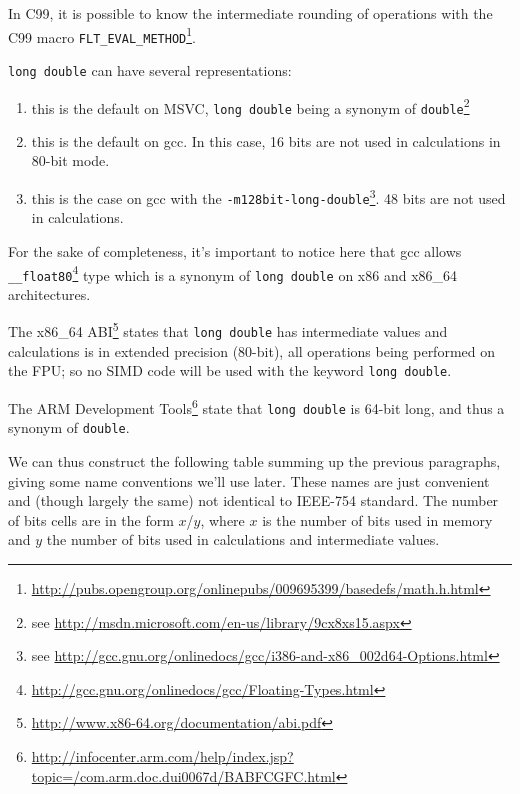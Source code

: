 In C99, it is possible to know the intermediate rounding of operations with the C99 macro \texttt{FLT\_EVAL\_METHOD}\footnote{\url{http://pubs.opengroup.org/onlinepubs/009695399/basedefs/math.h.html}}.


\texttt{long double} can have several representations:
\begin{enumerate}
\setlength{\itemsep}{0pt}
\setlength{\parskip}{0pt}
\item[\enumstyle{64-bit}] this is the default on MSVC, \texttt{long double} being a synonym of \texttt{double}\footnote{see \url{http://msdn.microsoft.com/en-us/library/9cx8xs15.aspx}}
\item[\enumstyle{96-bit}] this is the default on gcc. In this case, 16 bits are not used in calculations in 80-bit mode.
\item[\enumstyle{128-bit}] this is the case on gcc with the \texttt{-m128bit-long-double}\footnote{see \url{http://gcc.gnu.org/onlinedocs/gcc/i386-and-x86\_002d64-Options.html}}. 48 bits are not used in calculations.
\end{enumerate}

For the sake of completeness, it's important to notice here that gcc allows \texttt{\_\_float80}\footnote{\url{http://gcc.gnu.org/onlinedocs/gcc/Floating-Types.html}} type which is a synonym of \texttt{long double} on x86 and x86\_64 architectures.


The x86\_64 ABI\footnote{\url{http://www.x86-64.org/documentation/abi.pdf}} states that \texttt{long double} has intermediate values and calculations is in extended precision (80-bit), all operations being performed on the FPU; so no SIMD code will be used with the keyword \texttt{long double}.

The ARM Development Tools\footnote{\url{http://infocenter.arm.com/help/index.jsp?topic=/com.arm.doc.dui0067d/BABFCGFC.html}} state that \texttt{long double} is 64-bit long, and thus a synonym of \texttt{double}.


We can thus construct the following table summing up the previous paragraphs, giving some name conventions we'll use later. These names are just convenient and (though largely the same) not identical to IEEE-754 standard. The number of bits cells are in the form $x$/$y$, where $x$ is the number of bits used in memory and $y$ the number of bits used in calculations and intermediate values.

